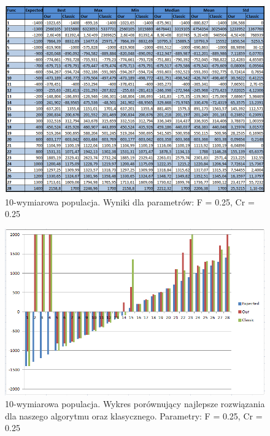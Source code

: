 \documentclass[a4paper]{article}
\begin{document}
\begin{figure}
\centering
\includegraphics[width=\textwidth]{F25Cr25L10tab.png}
\caption{10-wymiarowa populacja. Wyniki dla parametrów: F = 0.25, Cr = 0.25}
\end{figure}

\begin{figure}
\centering
\includegraphics[width=\textwidth]{F25Cr25L10chart.png}
\caption{10-wymiarowa populacja. Wykres porównujący najlepsze rozwiązania dla naszego algorytmu oraz klasycznego. Parametry: F = 0.25, Cr = 0.25}
\end{figure}
\end{document}
